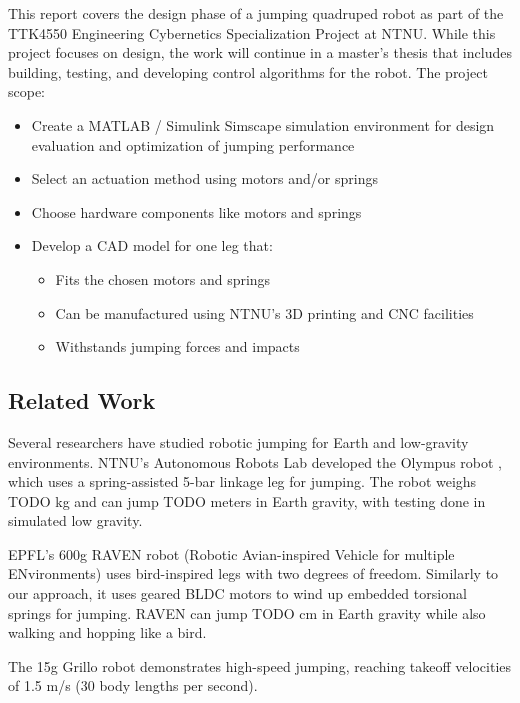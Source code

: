 This report covers the design phase of a jumping quadruped robot as part of the TTK4550 Engineering Cybernetics Specialization Project at NTNU. While this project focuses on design, the work will continue in a master's thesis that includes building, testing, and developing control algorithms for the robot.
The project scope:
\begin{itemize}
    \item Create a MATLAB / Simulink Simscape \cite{simulink_simscape} simulation environment for design evaluation and optimization of jumping performance
    \item Select an actuation method using motors and/or springs
    \item Choose hardware components like motors and springs
    \item Develop a CAD model for one leg that:
    \begin{itemize}
        \item Fits the chosen motors and springs
        \item Can be manufactured using NTNU's 3D printing and CNC facilities
        \item Withstands jumping forces and impacts
    \end{itemize}
\end{itemize}

\subsection{Related Work}
\label{sec:related_work}

Several researchers have studied robotic jumping for Earth and low-gravity environments. NTNU's Autonomous Robots Lab developed the Olympus robot \cite{OLYMPUS1} \cite{OLYMPUS2}, which uses a spring-assisted 5-bar linkage leg for jumping. The robot weighs TODO kg and can jump TODO meters in Earth gravity, with testing done in simulated low gravity.

EPFL's 600g RAVEN robot (Robotic Avian-inspired Vehicle for multiple ENvironments) \cite{RAVEN} uses bird-inspired legs with two degrees of freedom. Similarly to our approach, it uses geared BLDC motors to wind up embedded torsional springs for jumping. RAVEN can jump TODO cm in Earth gravity while also walking and hopping like a bird.

The 15g Grillo robot \cite{GRILLO} demonstrates high-speed jumping, reaching takeoff velocities of 1.5 m/s (30 body lengths per second).